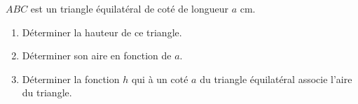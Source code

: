 
$ABC$ est un triangle équilatéral de coté de longueur $a$ cm.
\begin{enumerate}
\item Déterminer la hauteur de ce triangle.
\item Déterminer son aire en fonction de $a$.
\item Déterminer la fonction $h$ qui à un coté $a$ du triangle équilatéral associe l'aire du triangle.
\end{enumerate}